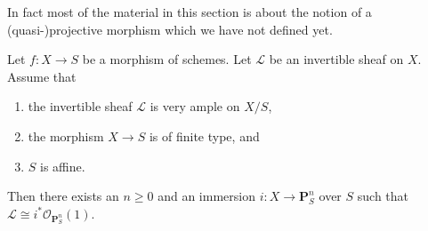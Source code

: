\noindent
In fact most of the material in this section is about the notion of
a (quasi-)projective morphism which we have not defined yet.

\begin{lemma}
\label{lemma-very-ample-finite-type-over-affine}
Let $f : X \to S$ be a morphism of schemes.
Let $\mathcal{L}$ be an invertible sheaf on $X$.
Assume that
\begin{enumerate}
\item the invertible sheaf $\mathcal{L}$ is very ample on $X/S$,
\item the morphism $X \to S$ is of finite type, and
\item $S$ is affine.
\end{enumerate}
Then there exists an $n \geq 0$ and an immersion
$i : X \to \mathbf{P}^n_S$ over $S$ such that
$\mathcal{L} \cong i^*\mathcal{O}_{\mathbf{P}^n_S}(1)$.
\end{lemma}

